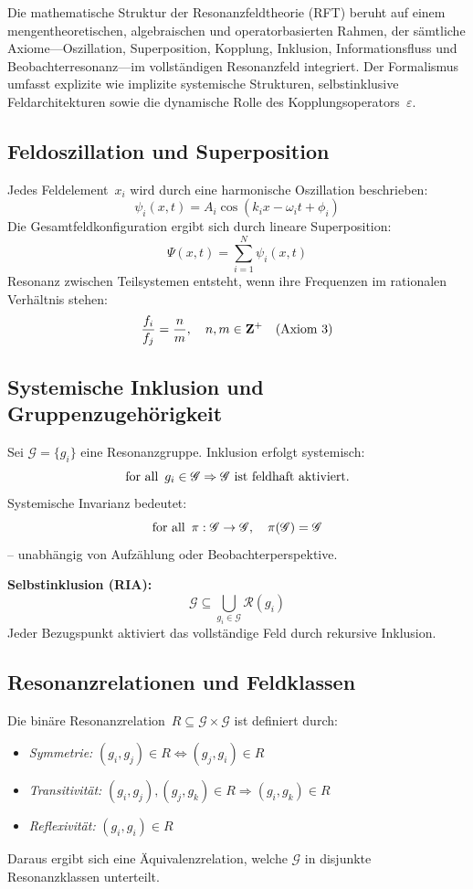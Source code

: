 \documentclass[12pt]{iopart}
\providecommand{\mathbb}[1]{\mathbf{#1}}
\providecommand{\mathcal}[1]{\mathscr{#1}}
\providecommand{\text}[1]{\mbox{#1}}
\providecommand{\forall}{\hbox{for all }}
\providecommand{\quad}{\hskip1em\relax}
\begin{document}
Die mathematische Struktur der Resonanzfeldtheorie (RFT) beruht auf einem mengentheoretischen, algebraischen und operatorbasierten Rahmen, der sämtliche Axiome—Oszillation, Superposition, Kopplung, Inklusion, Informationsfluss und Beobachterresonanz—im vollständigen Resonanzfeld integriert. Der Formalismus umfasst explizite wie implizite systemische Strukturen, selbstinklusive Feldarchitekturen sowie die dynamische Rolle des Kopplungsoperators~$\varepsilon$.

\subsection{Feldoszillation und Superposition}

Jedes Feldelement~$x_i$ wird durch eine harmonische Oszillation beschrieben:
\[
\psi_i(x, t) = A_i \cos(k_i x - \omega_i t + \phi_i)
\]
Die Gesamtfeldkonfiguration ergibt sich durch lineare Superposition:
\[
\Psi(x, t) = \sum_{i=1}^N \psi_i(x, t)
\]
Resonanz zwischen Teilsystemen entsteht, wenn ihre Frequenzen im rationalen Verhältnis stehen:
\[
\frac{f_i}{f_j} = \frac{n}{m}, \quad n, m \in \mathbb{Z}^+ \quad \text{(Axiom 3)}
\]

\subsection{Systemische Inklusion und Gruppenzugehörigkeit}

Sei $\mathcal{G} = \{g_i\}$ eine Resonanzgruppe. Inklusion erfolgt systemisch:
\[
\forall\, g_i \in \mathcal{G} \Rightarrow \mathcal{G} \text{ ist feldhaft aktiviert.}
\]
Systemische Invarianz bedeutet:
\[
\forall\, \pi : \mathcal{G} \to \mathcal{G},\quad \pi(\mathcal{G}) = \mathcal{G}
\]
– unabhängig von Aufzählung oder Beobachterperspektive.

\textbf{Selbstinklusion (RIA):}
\[
\mathcal{G} \subseteq \bigcup_{g_i \in \mathcal{G}} \mathcal{R}(g_i)
\]
Jeder Bezugspunkt aktiviert das vollständige Feld durch rekursive Inklusion.

\subsection{Resonanzrelationen und Feldklassen}

Die binäre Resonanzrelation~$R \subseteq \mathcal{G} \times \mathcal{G}$ ist definiert durch:
\begin{itemize}
	\item \textit{Symmetrie:} $(g_i, g_j) \in R \Leftrightarrow (g_j, g_i) \in R$
	\item \textit{Transitivität:} $(g_i, g_j), (g_j, g_k) \in R \Rightarrow (g_i, g_k) \in R$
	\item \textit{Reflexivität:} $(g_i, g_i) \in R$
\end{itemize}
Daraus ergibt sich eine Äquivalenzrelation, welche $\mathcal{G}$ in disjunkte Resonanzklassen unterteilt.
\end{document}
